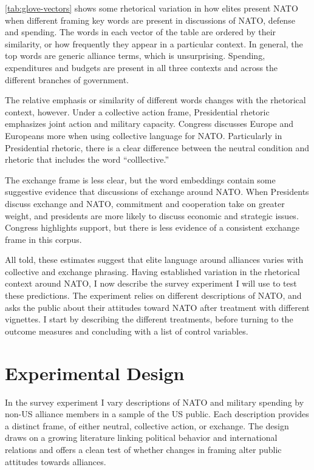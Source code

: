 \documentclass[12pt]{article}
\begin{document}
\autoref{tab:glove-vectors} shows some rhetorical variation in how elites present NATO when different framing key words are present in discussions of NATO, defense and spending. 
The words in each vector of the table are ordered by their similarity, or how frequently they appear in a particular context. 
In general, the top words are generic alliance terms, which is unsurprising.
Spending, expenditures and budgets are present in all three contexts and across the different branches of government.  


The relative emphasis or similarity of different words changes with the rhetorical context, however.
Under a collective action frame, Presidential rhetoric emphasizes joint action and military capacity.  
Congress discusses Europe and Europeans more when using collective language for NATO.
Particularly in Presidential rhetoric, there is a clear difference between the neutral condition and rhetoric that includes the word ``colllective.''


The exchange frame is less clear, but the word embeddings contain some suggestive evidence that discussions of exchange around NATO. 
When Presidents discuss exchange and NATO, commitment and cooperation take on greater weight, and presidents are more likely to discuss economic and strategic issues. 
Congress highlights support, but there is less evidence of a consistent exchange frame in this corpus.  


All told, these estimates suggest that elite language around alliances varies with collective and exchange phrasing. 
Having established variation in the rhetorical context around NATO, I now describe the survey experiment I will use to test these predictions. 
The experiment relies on different descriptions of NATO, and asks the public about their attitudes toward NATO after treatment with different vignettes. 
I start by describing the different treatments, before turning to the outcome measures and concluding with a list of control variables. 



\section{Experimental Design}


In the survey experiment I vary descriptions of NATO and military spending by non-US alliance members in a sample of the US public. 
Each description provides a distinct frame, of either neutral, collective action, or exchange. 
The design draws on a growing literature linking political behavior and international relations \citep{Hafner-Burtonetal2017} and offers a clean test of whether changes in framing alter public attitudes towards alliances.
\end{document}
